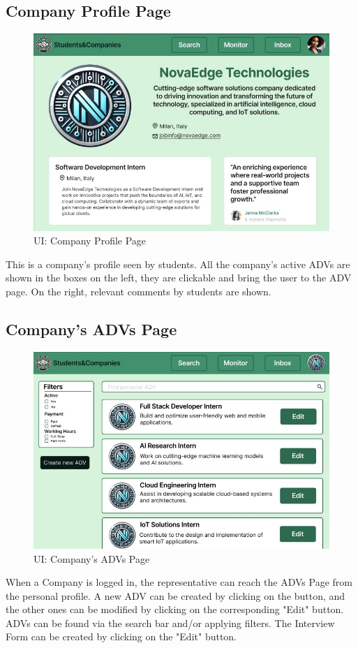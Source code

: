 \subsection{Company Profile Page}
\begin{figure}[H]
    \centering
    \includegraphics[width=15cm]{images/ui/companyprofile.jpg}
    \caption{UI: Company Profile Page}
\end{figure}
This is a company's profile seen by students. All the company's active ADVs are shown in the boxes on the left, they are clickable and bring the user to the ADV page. On the right, relevant comments by students are shown.

\subsection{Company's ADVs Page}
\begin{figure}[H]
    \centering
    \includegraphics[width=15cm]{images/ui/advspage.jpg}
    \caption{UI: Company's ADVs Page}
\end{figure}
When a Company is logged in, the representative can reach the ADVs Page from the personal profile. A new ADV can be created by clicking on the button, and the other ones can be modified by clicking on the corresponding "Edit" button. ADVs can be found via the search bar and/or applying filters. The Interview Form can be created by clicking on the "Edit" button.

